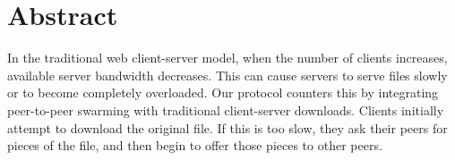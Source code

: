 \section {Abstract}
In the traditional web client-server model, when the number of clients increases, available server bandwidth decreases.  This can cause servers to serve files slowly or to become completely overloaded.  Our protocol counters this by integrating peer-to-peer swarming with traditional client-server downloads.  Clients initially attempt to download the original file.  If this is too slow, they ask their peers for pieces of the file, and then begin to offer those pieces to other peers.
